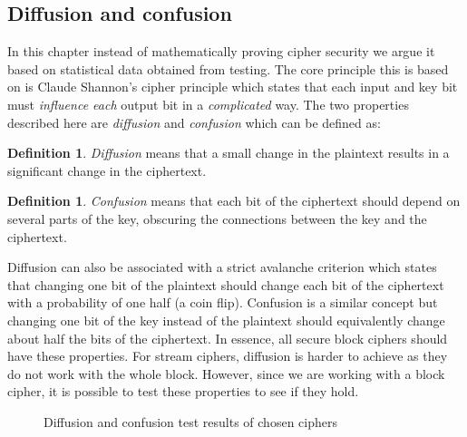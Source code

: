 \documentclass{Resources/UoBLab1}
\theoremstyle{definition}
\newtheorem{definition}[theorem]{Definition}
\begin{document}
\subsection{Diffusion and confusion}\label{sub:diff/conf}
In this chapter instead of mathematically proving cipher security we argue it based on statistical data obtained from testing. The core principle this is based on is Claude Shannon's cipher principle which states that each input and key bit must \textit{influence each} output bit in a \textit{complicated} way\cite{OneTime}. The two properties described here are \textit{diffusion} and \textit{confusion} which can be defined as:
\begin{definition}
    \textit{Diffusion} means that a small change in the plaintext results in a significant change in the ciphertext.
\end{definition}
\begin{definition}
    \textit{Confusion} means that each bit of the ciphertext should depend on several parts of the key, obscuring the connections between the key and the ciphertext.
\end{definition}
Diffusion can also be associated with a strict avalanche criterion which states that changing one bit of the plaintext should change each bit of the ciphertext with a probability of one half (a coin flip). Confusion is a similar concept but changing one bit of the key instead of the plaintext should equivalently change about half the bits of the ciphertext. In essence, all secure block ciphers should have these properties. For stream ciphers, diffusion is harder to achieve as they do not work with the whole block. However, since we are working with a block cipher, it is possible to test these properties to see if they hold.\medskip

\begin{figure}
    \caption{Diffusion and confusion test results of chosen ciphers}\label{fig:diffconftests}
    \hspace{-1cm}
    \centering
    \begin{minipage}{0.5\textwidth}
        \centering
        
    \end{minipage}\hfill
    \begin{minipage}{0.5\textwidth}
        \centering
        
    \end{minipage}

    \hspace{-1cm}
    \begin{minipage}{0.5\textwidth}
        \centering
        
    \end{minipage}\hfill
    \begin{minipage}{0.5\textwidth}
        \centering
        
    \end{minipage}
    \vspace{-2cm}
\end{figure}
\end{document}
